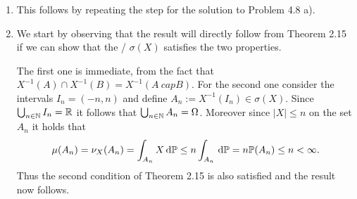 \documentclass{lecturenotes}
\begin{document}
\begin{enumerate}[label={(\alph*)}]
\item This follows by repeating the step for the solution to Problem 4.8 a). 
%

\item We start by observing that the result will directly follow from Theorem 2.15 if we can show that the \sigalg/ $\sigma(X)$ satisfies the two properties.

The first one is immediate, from the fact that $X^{-1}(A) \cap X^{-1}(B) = X^{-1}(A\ cap B)$. For the second one consider the intervals $I_n = (-n,n)$ and define $A_n := X^{-1}(I_n) \in \sigma(X)$. Since $\bigcup_{n \in \mathbb N} I_n = \mathbb R$ it follows that $\bigcup_{n \in \mathbb N} A_n = \Omega$. Moreover since $|X| \le n$ on the set $A_n$ it holds that
\[
	\mu(A_n) = \nu_X(A_n) = \int_{A_n} X \, \mathrm{d} \mathbb P \le n \int_{A_n} \, \mathrm{d} \mathbb P = n \mathbb P(A_n) \le n < \infty.
\]
Thus the second condition of Theorem 2.15 is also satisfied and the result now follows.

	
\end{enumerate}

\bigskip
\end{document}
